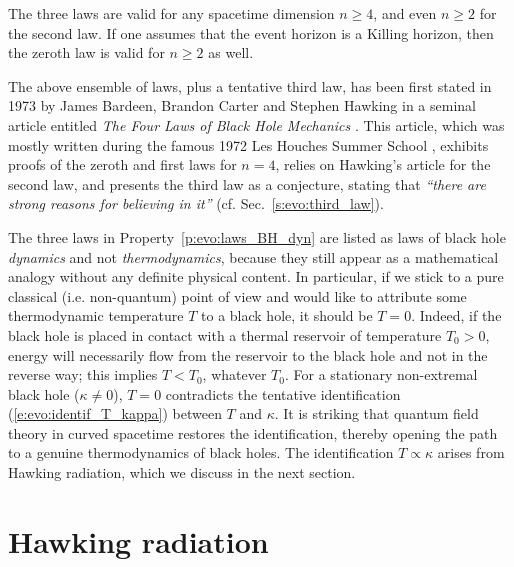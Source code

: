 \begin{remark}
The three laws are valid for any spacetime dimension $n\geq 4$, and even
$n\geq 2$ for the second law. If one assumes that the event horizon is a Killing
horizon, then the zeroth law is valid for $n\geq 2$ as well.
\end{remark}

\begin{hist}
The above ensemble of laws, plus a tentative third law, has been first stated in 1973 by
James Bardeen, Brandon Carter
and Stephen Hawking in a seminal article
entitled \emph{The Four Laws of Black Hole Mechanics} \cite{BardeCH73}. This
article, which was mostly written during the famous 1972 Les Houches Summer School \cite{DeWit73}, exhibits proofs of the zeroth and first laws for $n=4$,
relies on Hawking's article \cite{Hawki72} for the second law, and presents
the third law as a conjecture, stating that \emph{``there are strong reasons for believing in it''}
(cf. Sec.~\ref{s:evo:third_law}).
\end{hist}

The three laws in Property~\ref{p:evo:laws_BH_dyn} are listed as laws of black hole \emph{dynamics} and not \emph{thermodynamics}, because they still appear as a mathematical analogy without any definite physical content. In particular, if we stick to a
pure classical (i.e. non-quantum) point of view and would like to attribute some
thermodynamic temperature $T$ to a black hole, it should be $T=0$. Indeed, if the black hole is placed in contact with a thermal reservoir of temperature $T_0>0$, energy will necessarily flow from the reservoir to the black hole and not in the reverse way; this implies $T<T_0$, whatever $T_0$.
For a stationary non-extremal black hole ($\kappa\neq 0$), $T=0$ contradicts the tentative identification (\ref{e:evo:identif_T_kappa}) between $T$ and $\kappa$.
It is striking that quantum field theory in curved spacetime
restores the identification, thereby opening the path to a genuine thermodynamics of
black holes. The identification $T\propto \kappa$ arises from Hawking radiation,
which we discuss in the next section.


\section{Hawking radiation} \label{s:evo:Hawing_rad_main}


